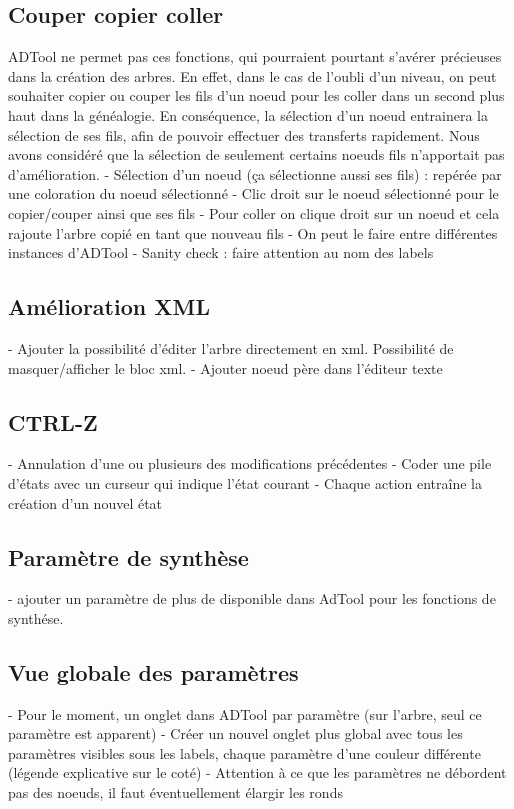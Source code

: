 	\subsection{Couper copier coller}
	
	ADTool ne permet pas ces fonctions, qui pourraient pourtant s'avérer précieuses dans la création des arbres. En effet, dans le cas de l'oubli d'un niveau, on peut souhaiter copier ou couper les fils d'un noeud pour les coller dans un second plus haut dans la généalogie.
	En conséquence, la sélection d'un noeud entrainera la sélection de ses fils, afin de pouvoir effectuer des transferts rapidement. Nous avons considéré que la sélection de seulement certains noeuds fils n'apportait pas d'amélioration.
	- Sélection d'un noeud (ça sélectionne aussi ses fils) : repérée par une coloration du noeud sélectionné
	- Clic droit sur le noeud sélectionné pour le copier/couper ainsi que ses fils
	- Pour coller on clique droit sur un noeud et cela rajoute l'arbre copié en tant que nouveau fils
	- On peut le faire entre différentes instances d'ADTool
	- Sanity check : faire attention au nom des labels

	\subsection{Amélioration XML}

	- Ajouter la possibilité d'éditer l'arbre directement en xml. Possibilité de masquer/afficher le bloc xml.
	- Ajouter noeud père dans l'éditeur texte 
	
	\subsection{CTRL-Z}

	- Annulation d'une ou plusieurs des modifications précédentes
	- Coder une pile d'états avec un curseur qui indique l'état courant
	- Chaque action entraîne la création d'un nouvel état
	
	\subsection{Paramètre de synthèse}
	- ajouter un paramètre de plus de disponible dans AdTool pour les fonctions de synthése.
		
	\subsection{Vue globale des paramètres}

	- Pour le moment, un onglet dans ADTool par paramètre (sur l'arbre, seul ce paramètre est apparent)	
	- Créer un nouvel onglet plus global avec tous les paramètres visibles sous les labels, chaque paramètre d'une couleur différente (légende explicative sur le coté)
	- Attention à ce que les paramètres ne débordent pas des noeuds, il faut éventuellement élargir les ronds